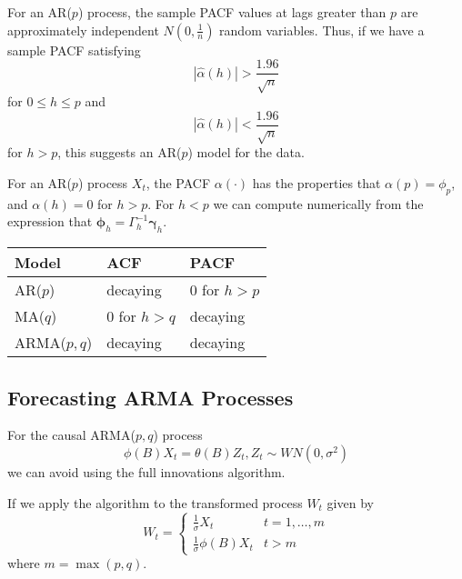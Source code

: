 \begin{thm}
  \label{defn:arma_processes:9}
  For an AR($p$) process, the sample PACF values at lags greater than
  $p$ are approximately independent $N(0, \frac{1}{n})$ random
  variables.  Thus, if we have a sample PACF satisfying
  \begin{equation}
    \label{eq:32}
    |\hat \alpha(h)| > \frac{1.96}{\sqrt{n}}
  \end{equation} for $0 \leq h \leq p$ and
  \begin{equation}
    \label{eq:33}
    |\hat \alpha(h)| < \frac{1.96}{\sqrt{n}}
  \end{equation} for $h > p$, this suggests an AR($p$) model for the data.
\end{thm}

\begin{thm}
  \label{defn:arma_processes:10}
  For an AR($p$) process $X_{t}$, the PACF $\alpha(\cdot)$ has the
  properties that $\alpha(p) = \phi_{p}$, and $\alpha(h) = 0$ for $h >
  p$.  For $h < p$ we can compute numerically from the expression that
  $\mathbf{\phi}_{h} = \Gamma^{-1}_{h} \mathbf{\gamma}_{h}$.
\end{thm}

\begin{table}
  \centering
  \begin{tabular}{lll}
    \toprule
    Model & ACF & PACF \\
    \midrule
    AR($p$) & decaying & 0 for $h > p$ \\
    MA($q$) & $0$ for $h > q$ & decaying \\
    ARMA($p, q$) & decaying & decaying
  \end{tabular}
\end{table}

\subsection{Forecasting ARMA Processes}
\label{sec:forec-arma-proc}

For the causal ARMA($p, q$) process
\begin{equation}
  \label{eq:35}
  \phi(B) X_{t} = \theta(B) Z_{t}, Z_{t} \sim WN(0, \sigma^{2})
\end{equation} we can avoid using the full innovations algorithm.

If we apply the algorithm to the transformed process $W_{t}$ given by
\begin{equation}
  \label{eq:36}
  W_{t} =
  \begin{cases}
    \frac{1}{\sigma} X_{t} & t = 1, \dots, m \\
    \frac{1}{\sigma} \phi(B) X_{t} & t > m
  \end{cases}
\end{equation} where $m = \max(p, q)$.

